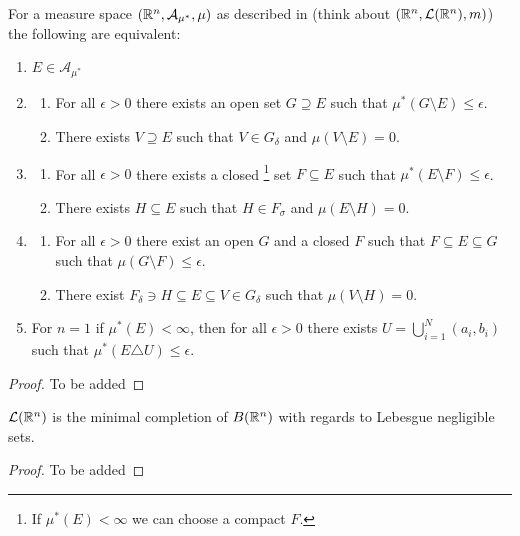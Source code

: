 \documentclass[11pt,a4paper]{article}
\newcommand{\A}{\mathcal A}
\begin{document}
\begin{corollary}
  For a measure space $(\R^n, \A_{\mu^*},\mu)$ as described in
   (think about $(\mathbb{R}^n,\mathcal{L}(\mathbb{R}^n),m)$)
  the following are equivalent:
  \begin{enumerate}
    \item[(0)] $E \in \A_{\mu^*}$
    \item[(1)]
      \begin{enumerate}
        \item[(a)] For all $\epsilon > 0$ there exists an open set
          $G \supseteq E$ such that $\mu^*(G \setminus E) \le \epsilon$.
        \item[(b)] There exists $V \supseteq E$ such that $V \in G_{\delta}$
          and $\mu(V \setminus E) = 0$.
      \end{enumerate}
    \item[(2)]
      \begin{enumerate}
        \item[(a)] For all $\epsilon > 0$ there exists a closed
          \footnote{If $\mu^*(E) < \infty$ we can choose a compact $F$.}
          set
          $F \subseteq E$ such that $\mu^*(E \setminus F) \le \epsilon$.
        \item[(b)] There exists $H \subseteq E$ such that $H \in F_{\sigma}$
          and $\mu(E \setminus H) = 0$.
      \end{enumerate}
    \item[(3)]
      \begin{enumerate}
        \item[(a)] For all $\epsilon > 0$ there exist an open $G$ and a closed
          $F$ such that $F \subseteq E \subseteq G$ such that
          $\mu(G \setminus F) \le \epsilon$.
        \item[(b)] There exist
          $F_{\delta} \ni H \subseteq E \subseteq V \in G_{\delta}$ such that
          $\mu(V \setminus H) = 0$.
      \end{enumerate}
    \item[(4)] For $n = 1$ if $\mu^*(E) < \infty$, then for all $\epsilon > 0$
      there exists $U = \bigcup_{i=1}^{N} (a_i,b_i)$ such that
      $\mu^*(E \triangle U) \le \epsilon$.
  \end{enumerate}
\end{corollary}
\begin{proof}
  To be added
\end{proof}

\begin{corollary}
  $\mathcal{L}(\mathbb{R}^n)$ is the minimal completion of $B(\mathbb{R}^n)$ with regards to
  Lebesgue negligible sets.
\end{corollary}
\begin{proof}
  To be added
\end{proof}
\end{document}
